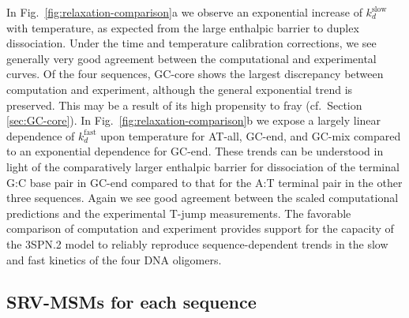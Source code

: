 \documentclass[journal=jpcbfk,manuscript=article]{achemso}
\begin{document}
In Fig.~\ref{fig:relaxation-comparison}a we observe an exponential increase of $k_d^\mathrm{slow}$ with temperature, as expected from the large enthalpic barrier to duplex dissociation.\cite{Craig1971RelaxationOligonucleotides,Porschke1971CooperativeTransition,Williams1989LaserDGCATGC} Under the time and temperature calibration corrections, we see generally very good agreement between the computational and experimental curves. Of the four sequences, GC-core shows the largest discrepancy between computation and experiment, although the general exponential trend is preserved. This may be a result of its high propensity to fray (cf.\ Section \ref{sec:GC-core}). In Fig.~\ref{fig:relaxation-comparison}b we expose a largely linear dependence of $k_d^\mathrm{fast}$ upon temperature for AT-all, GC-end, and GC-mix compared to an exponential dependence for GC-end. These trends can be understood in light of the comparatively larger enthalpic barrier for dissociation of the terminal G:C base pair in GC-end compared to that for the A:T terminal pair in the other three sequences. Again we see good agreement between the scaled computational predictions and the experimental T-jump measurements. The favorable comparison of computation and experiment provides support for the capacity of the 3SPN.2 model to reliably reproduce sequence-dependent trends in the slow and fast kinetics of the four DNA oligomers.






\subsection{SRV-MSMs for each sequence}
\end{document}
